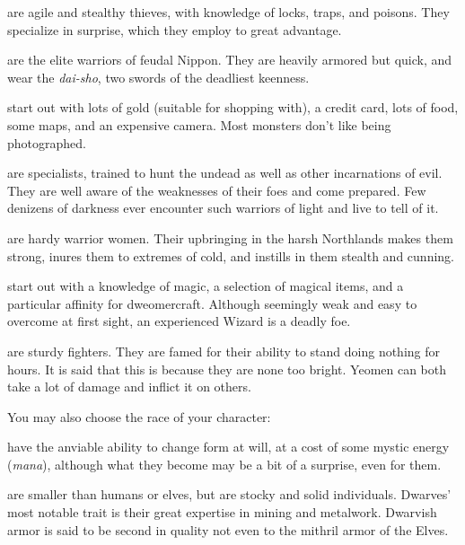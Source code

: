 \item[\bb{Rogues}]%
are agile and stealthy thieves, with knowledge of locks,
traps, and poisons.  They specialize in surprise, which they employ
to great advantage.

\item[\bb{Samurai}]%
are the elite warriors of feudal Nippon.  They are heavily
armored but quick, and wear the {\it dai-sho}, two swords of the deadliest
keenness.

\item[\bb{Tourists}]%
start out with lots of gold (suitable for shopping with),
a credit card, lots of food, some maps, and an expensive camera.  Most
monsters don't like being photographed.

\item[\bb{Undead Slayers}]%
are specialists,  trained to hunt the undead as well
as other incarnations of evil.  They are well aware of the weaknesses of
their foes and come prepared.  Few denizens of darkness ever encounter such
warriors of light and live to tell of it.

\item[\bb{Valkyries}]%
are hardy warrior women.  Their upbringing in the harsh
Northlands makes them strong, inures them to extremes of cold, and instills
in them stealth and cunning.

\item[\bb{Wizards}]%
start out with a knowledge of magic, a selection of magical
items, and a particular affinity for dweomercraft.  Although seemingly weak
and easy to overcome at first sight, an experienced Wizard is a deadly foe.

\item[\bb{Yeomen}]%
are sturdy fighters. They are famed for their ability to stand
doing nothing for hours. It is said that this is because they are none too
bright. Yeomen can both take a lot of damage and inflict it on others.
\elist
\nd %

You may also choose the race of your character:
\blist{}

\item[\bb{Doppelgangers}]%
have the anviable ability to change form at will,  at
a cost of some mystic energy ({\it mana\/}),  although what they become
may be a bit of a surprise,  even for them.

\item[\bb{Dwarves}]%
are smaller than humans or elves, but are stocky and solid
individuals.  Dwarves' most notable trait is their great expertise in mining
and metalwork.  Dwarvish armor is said to be second in quality not even to the
mithril armor of the Elves.

